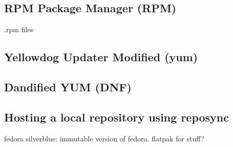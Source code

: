 
\subsection{RPM Package Manager (RPM)}

.rpm files

\subsection{Yellowdog Updater Modified (yum)}
 
\subsection{Dandified YUM (DNF)}
 
\subsection{Hosting a local repository using reposync}

fedora silverblue: immutable version of fedora. flatpak for stuff?

